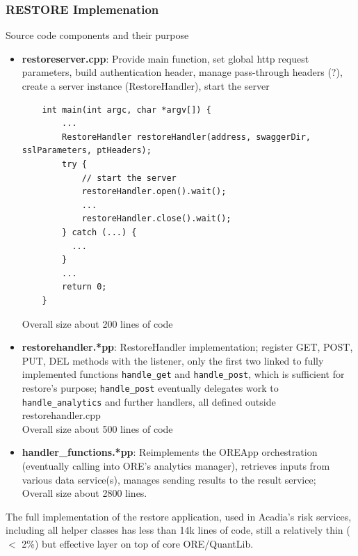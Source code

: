 \documentclass[12pt, a4paper]{report}
\begin{document}
\subsubsection*{RESTORE Implemenation}

Source code components and their purpose
\begin{itemize}
\item {\bf restoreserver.cpp}: Provide main function, set global http request parameters, build
  authentication header, manage pass-through headers (?), create a server instance (RestoreHandler),
  start the server
  \begin{verbatim}
    int main(int argc, char *argv[]) {
        ...
        RestoreHandler restoreHandler(address, swaggerDir, sslParameters, ptHeaders);
        try {
            // start the server
            restoreHandler.open().wait();
            ...
            restoreHandler.close().wait();
        } catch (...) {
          ...
        }
        ...
        return 0;
    }    
  \end{verbatim}
  Overall size about 200 lines of code
\item {\bf restorehandler.*pp}: RestoreHandler implementation; register GET, POST, PUT, DEL methods with
  the listener, only the first two linked to fully implemented functions {\tt handle\_get} and
  {\tt handle\_post}, which is sufficient for restore's purpose;
  {\tt handle\_post} eventually delegates work to {\tt handle\_analytics} and further handlers,
  all defined outside restorehandler.cpp\\
  Overall size about 500 lines of code
\item {\bf handler\_functions.*pp}: Reimplements the OREApp orchestration (eventually calling into ORE's
  analytics manager), retrieves inputs from various data service(s), manages sending results to the result
  service;\\
  Overall size about 2800 lines.
\end{itemize}
The full implementation of the restore application, used in Acadia's risk services, including all
helper classes has less than 14k lines of code, still a relatively thin ($<$ 2\%) but effective layer
on top of core ORE/QuantLib.
\end{document}
